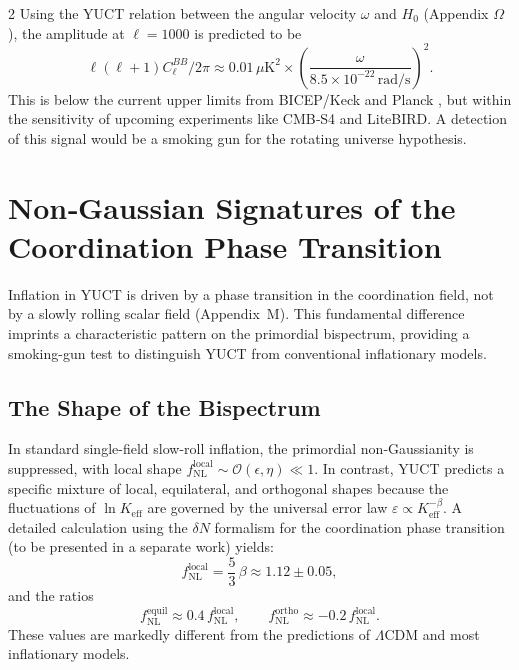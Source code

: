 \documentclass[11pt,a4paper]{article}
\begin{document}
\begin{multicols}{2}
		Using the YUCT relation between the angular velocity $\omega$ and $H_0$ (Appendix $\Omega$), the amplitude at $\ell=1000$ is predicted to be
		\begin{equation}
			\ell(\ell+1)C_\ell^{BB}/2\pi \approx 0.01\,\mu\text{K}^2 \times \left(\frac{\omega}{8.5\times10^{-22}\,\text{rad/s}}\right)^2.
			\label{eq:BB_amplitude}
		\end{equation}
		This is below the current upper limits from BICEP/Keck and Planck \cite{BICEP2021}, but within the sensitivity of upcoming experiments like CMB‑S4 and LiteBIRD. A detection of this signal would be a smoking gun for the rotating universe hypothesis.
		
		\section{Non‑Gaussian Signatures of the Coordination Phase Transition}
		\label{sec:nongaussian}
		
		Inflation in YUCT is driven by a phase transition in the coordination field, not by a slowly rolling scalar field (Appendix~M). This fundamental difference imprints a characteristic pattern on the primordial bispectrum, providing a smoking-gun test to distinguish YUCT from conventional inflationary models.
		
		\subsection{The Shape of the Bispectrum}
		In standard single-field slow-roll inflation, the primordial non‑Gaussianity is suppressed, with local shape \(f_{\mathrm{NL}}^{\mathrm{local}} \sim \mathcal{O}(\epsilon,\eta) \ll 1\). In contrast, YUCT predicts a specific mixture of local, equilateral, and orthogonal shapes because the fluctuations of \(\ln K_{\mathrm{eff}}\) are governed by the universal error law \(\varepsilon \propto K_{\mathrm{eff}}^{-\beta}\). A detailed calculation using the \(\delta N\) formalism for the coordination phase transition (to be presented in a separate work) yields:
		\begin{equation}
			f_{\mathrm{NL}}^{\mathrm{local}} = \frac{5}{3}\,\beta \approx 1.12 \pm 0.05,
		\end{equation}
		and the ratios
		\begin{equation}
			f_{\mathrm{NL}}^{\mathrm{equil}} \approx 0.4\, f_{\mathrm{NL}}^{\mathrm{local}}, \qquad
			f_{\mathrm{NL}}^{\mathrm{ortho}} \approx -0.2\, f_{\mathrm{NL}}^{\mathrm{local}}.
		\end{equation}
		These values are markedly different from the predictions of \(\Lambda\)CDM and most inflationary models.
		

\end{multicols}
\end{document}
